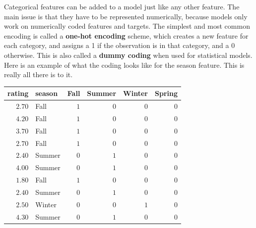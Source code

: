 \documentclass[
  letterpaper,
]{krantz}
\begin{document}
Categorical features can be added to a model just like any other
feature. The main issue is that they have to be represented numerically,
because models only work on numerically coded features and targets. The
simplest and most common encoding is called a \textbf{one-hot encoding}
scheme, which creates a new feature for each category, and assigns a 1
if the observation is in that category, and a 0 otherwise. This is also
called a \textbf{dummy coding} when used for statistical models. Here is
an example of what the coding looks like for the season feature. This is
really all there is to it.

\begin{longtable*}{rlrrrr}
\toprule
rating & season & Fall & Summer & Winter & Spring \\ 
\midrule\addlinespace[2.5pt]
\textcolor[HTML]{404040}{$2.70$} & Fall & \textcolor[HTML]{404040}{$1$} & \textcolor[HTML]{404040}{$0$} & \textcolor[HTML]{404040}{$0$} & \textcolor[HTML]{404040}{$0$} \\ 
\textcolor[HTML]{404040}{$4.20$} & Fall & \textcolor[HTML]{404040}{$1$} & \textcolor[HTML]{404040}{$0$} & \textcolor[HTML]{404040}{$0$} & \textcolor[HTML]{404040}{$0$} \\ 
\textcolor[HTML]{404040}{$3.70$} & Fall & \textcolor[HTML]{404040}{$1$} & \textcolor[HTML]{404040}{$0$} & \textcolor[HTML]{404040}{$0$} & \textcolor[HTML]{404040}{$0$} \\ 
\textcolor[HTML]{404040}{$2.70$} & Fall & \textcolor[HTML]{404040}{$1$} & \textcolor[HTML]{404040}{$0$} & \textcolor[HTML]{404040}{$0$} & \textcolor[HTML]{404040}{$0$} \\ 
\textcolor[HTML]{404040}{$2.40$} & Summer & \textcolor[HTML]{404040}{$0$} & \textcolor[HTML]{404040}{$1$} & \textcolor[HTML]{404040}{$0$} & \textcolor[HTML]{404040}{$0$} \\ 
\textcolor[HTML]{404040}{$4.00$} & Summer & \textcolor[HTML]{404040}{$0$} & \textcolor[HTML]{404040}{$1$} & \textcolor[HTML]{404040}{$0$} & \textcolor[HTML]{404040}{$0$} \\ 
\textcolor[HTML]{404040}{$1.80$} & Fall & \textcolor[HTML]{404040}{$1$} & \textcolor[HTML]{404040}{$0$} & \textcolor[HTML]{404040}{$0$} & \textcolor[HTML]{404040}{$0$} \\ 
\textcolor[HTML]{404040}{$2.40$} & Summer & \textcolor[HTML]{404040}{$0$} & \textcolor[HTML]{404040}{$1$} & \textcolor[HTML]{404040}{$0$} & \textcolor[HTML]{404040}{$0$} \\ 
\textcolor[HTML]{404040}{$2.50$} & Winter & \textcolor[HTML]{404040}{$0$} & \textcolor[HTML]{404040}{$0$} & \textcolor[HTML]{404040}{$1$} & \textcolor[HTML]{404040}{$0$} \\ 
\textcolor[HTML]{404040}{$4.30$} & Summer & \textcolor[HTML]{404040}{$0$} & \textcolor[HTML]{404040}{$1$} & \textcolor[HTML]{404040}{$0$} & \textcolor[HTML]{404040}{$0$} \\ 
\bottomrule
\end{longtable*}
\end{document}
